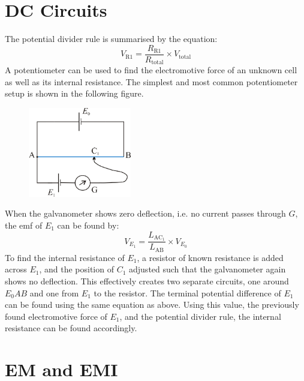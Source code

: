 \documentclass[a4paper,11pt]{article}
\begin{document}
	\section{DC Circuits}
	The potential divider rule is summarised by the equation: 
	\begin{equation*}
	V_{\text{R1}} = \frac{R_{\text{R1}}}{R_{\text{total}}} \times V_{\text{total}}
	\end{equation*}
	A potentiometer can be used to find the electromotive force of an unknown cell as well as its internal resistance. The simplest and most common potentiometer setup is shown in the following figure.
	\begin{figure}[H]
		\centering \includegraphics[width=0.4\textwidth]{potentiometer}
	\end{figure}
	When the galvanometer shows zero deflection, i.e. no current passes through $G$, the emf of $E_1$ can be found by:
	\begin{equation*}
	V_{E_1} = \frac{L_{\text{AC$_1$}}}{L_{\text{AB}}} \times V_{E_0}
	\end{equation*}
	To find the internal resistance of $E_1$, a resistor of known resistance is added across $E_1$, and the position of $C_1$ adjusted such that the galvanometer again shows no deflection. This effectively creates two separate circuits, one around $E_0AB$ and one from $E_1$ to the resistor. The terminal potential difference of $E_1$ can be found using the same equation as above. Using this value, the previously found electromotive force of $E_1$, and the potential divider rule, the internal resistance can be found accordingly. 
	\section{EM and EMI}
\end{document}
